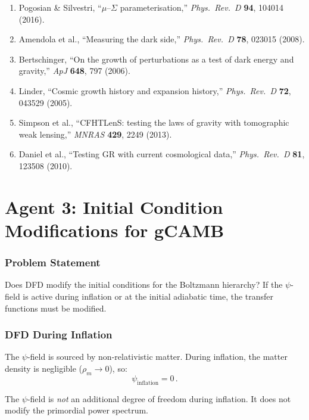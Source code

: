 \documentclass[11pt,a4paper]{article}
\begin{document}
\begin{enumerate}
\item Pogosian \& Silvestri, ``$\mu$--$\Sigma$ parameterisation,'' \textit{Phys.\ Rev.\ D} \textbf{94}, 104014 (2016).
\item Amendola et al., ``Measuring the dark side,'' \textit{Phys.\ Rev.\ D} \textbf{78}, 023015 (2008).
\item Bertschinger, ``On the growth of perturbations as a test of dark energy and gravity,'' \textit{ApJ} \textbf{648}, 797 (2006).
\item Linder, ``Cosmic growth history and expansion history,'' \textit{Phys.\ Rev.\ D} \textbf{72}, 043529 (2005).
\item Simpson et al., ``CFHTLenS: testing the laws of gravity with tomographic weak lensing,'' \textit{MNRAS} \textbf{429}, 2249 (2013).
\item Daniel et al., ``Testing GR with current cosmological data,'' \textit{Phys.\ Rev.\ D} \textbf{81}, 123508 (2010).
\end{enumerate}


\part{Agent 3: Initial Condition Modifications for gCAMB}
\label{part:initial-conditions}

\section{Problem Statement}

Does DFD modify the initial conditions for the Boltzmann hierarchy? If the $\psi$-field is active during inflation or at the initial adiabatic time, the transfer functions must be modified.

\section{DFD During Inflation}

The $\psi$-field is sourced by non-relativistic matter. During inflation, the matter density is negligible ($\rho_m \to 0$), so:
\begin{equation}
\psi_{\mathrm{inflation}} = 0\,.
\end{equation}

The $\psi$-field is \emph{not} an additional degree of freedom during inflation. It does not modify the primordial power spectrum.
\end{document}
